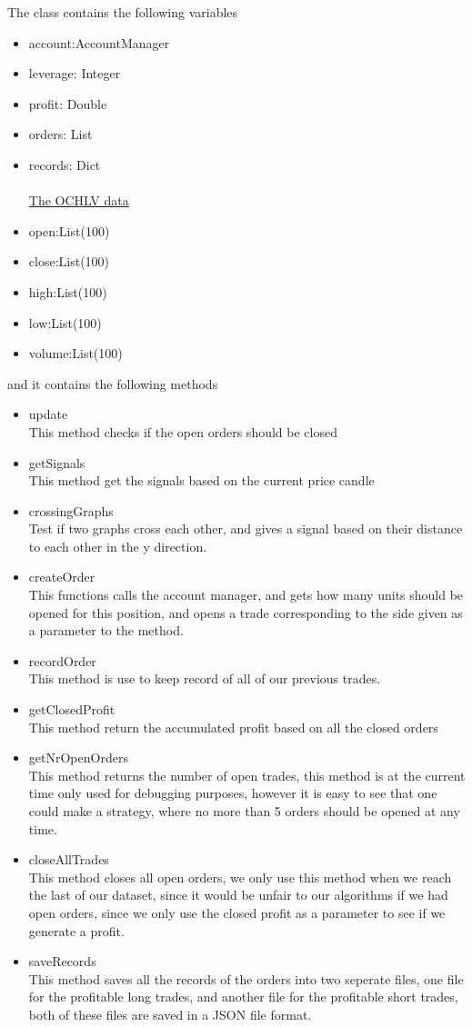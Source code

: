 The class contains the following variables
\begin{itemize}
\item{account:AccountManager}
\item{leverage: Integer}
\item{profit: Double}
\item{orders: List}
\item{records: Dict}
\\
\\
\underline{The OCHLV data}
\item{open:List(100)}
\item{close:List(100)}
\item{high:List(100)}
\item{low:List(100)}
\item{volume:List(100)}
\end{itemize}

and it contains the following methods
\begin{itemize}
\item{update}
\\
This method checks if the open orders should be closed
\item{getSignals}\\
This method get the signals based on the current price candle
\item{crossingGraphs}\\
Test if two graphs cross each other, and gives a signal based  on their distance to each other in the y direction.
\item{createOrder}\\
This functions calls the account manager, and gets how many units should be opened for this position, and opens a trade corresponding to the side given as a parameter to the method.
\item{recordOrder}\\
This method is use to keep record of all of our previous trades.
\item{getClosedProfit}\\
This method return the accumulated profit based on all the closed orders
\item{getNrOpenOrders}\\
This method returns the number of open trades, this method is at the current time only used for debugging purposes, however it is easy to see that one could make a strategy, where no more than 5 orders should be opened at any time.
\item{closeAllTrades}\\
This method closes all open orders, we only use this method when we reach the last of our dataset, since it would be unfair to our algorithms if we had open orders, since we only use the closed profit as a parameter to see if we generate a profit.
\item{saveRecords}\\
This method saves all the records of the orders into two seperate files, one file for the profitable long trades, and another file for the profitable short trades, both of these files are saved in a JSON file format.
\end{itemize}


